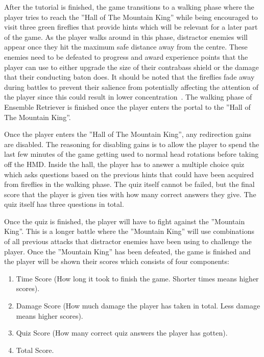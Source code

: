 After the tutorial is finished, the game transitions to a walking phase where the player tries to reach the ''Hall of The Mountain King'' while being encouraged to visit three green fireflies that provide hints which will be relevant for a later part of the game. As the player walks around in this phase, distractor enemies will appear once they hit the maximum safe distance away from the centre. These enemies need to be defeated to progress and award experience points that the player can use to either upgrade the size of their contrabass shield or the damage that their conducting baton does. It should be noted that the fireflies fade away during battles to prevent their salience from potentially affecting the attention of the player since this could result in lower concentration~\cite{sitzmann2018saliency}. The walking phase of Ensemble Retriever is finished once the player enters the portal to the ''Hall of The Mountain King''. 

Once the player enters the ''Hall of The Mountain King'', any redirection gains are disabled. The reasoning for disabling gains is to allow the player to spend the last few minutes of the game getting used to normal head rotations before taking off the HMD. Inside the hall, the player has to answer a multiple choice quiz which asks questions based on the previous hints that could have been acquired from fireflies in the walking phase. The quiz itself cannot be failed, but the final score that the player is given ties with how many correct answers they give. The quiz itself has three questions in total.

Once the quiz is finished, the player will have to fight against the ''Mountain King''. This is a longer battle where the ''Mountain King'' will use combinations of all previous attacks that distractor enemies have been using to challenge the player. Once the ''Mountain King'' has been defeated, the game is finished and the player will be shown their scores which consists of four components:
\begin{enumerate}
    \item Time Score (How long it took to finish the game. Shorter times means higher scores).
    \item Damage Score (How much damage the player has taken in total. Less damage means higher scores).
    \item Quiz Score (How many correct quiz answers the player has gotten).
    \item Total Score.
\end{enumerate}

